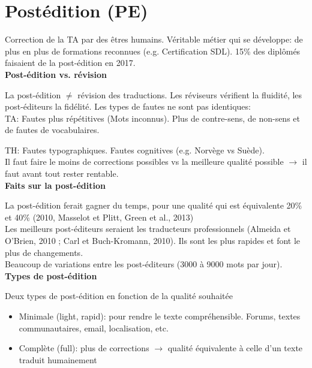 \section{Postédition (PE)}

Correction de la TA par des êtres humains. Véritable métier qui se développe: de plus en plus de formations reconnues (e.g. Certification SDL). 15\% des diplômés faisaient de la post-édition en 2017.\\

\textbf{Post-édition vs. révision}

La post-édition $\neq$ révision des traductions. Les réviseurs vérifient la fluidité, les post-éditeurs la fidélité. Les types de fautes ne sont pas identiques:\\

TA: Fautes plus répétitives (Mots inconnus). Plus de contre-sens, de non-sens et de fautes de vocabulaires.

TH: Fautes typographiques. Fautes cognitives (e.g. Norvège vs Suède).\\

Il faut faire le moins de corrections possibles vs la meilleure qualité possible $\rightarrow$ il faut avant tout rester rentable.\\

\textbf{Faits sur la post-édition}

La post-édition ferait gagner du temps, pour une qualité qui est équivalente
20\% et 40\% (2010, Masselot et Plitt, Green et al., 2013)\\

Les meilleurs post-éditeurs seraient les traducteurs professionnels (Almeida et O'Brien, 2010 ; Carl et Buch-Kromann, 2010). Ils sont les plus rapides et font le plus de changements.\\

Beaucoup de variations entre les post-éditeurs (3000 à 9000 mots par jour).\\

\textbf{Types de post-édition}

Deux types de post-édition en fonction de la qualité souhaitée

\begin{itemize}
    \item Minimale (light, rapid): pour rendre le texte compréhensible. Forums, textes communautaires, email, localisation, etc.
    \item Complète (full): plus de corrections $\rightarrow$ qualité équivalente à celle d'un texte traduit humainement\\
\end{itemize}

